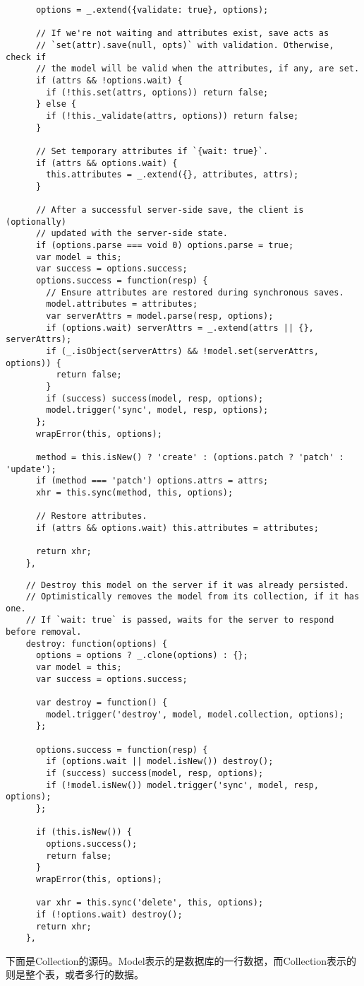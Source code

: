   \begin{lstlisting}
      options = _.extend({validate: true}, options);

      // If we're not waiting and attributes exist, save acts as
      // `set(attr).save(null, opts)` with validation. Otherwise, check if
      // the model will be valid when the attributes, if any, are set.
      if (attrs && !options.wait) {
        if (!this.set(attrs, options)) return false;
      } else {
        if (!this._validate(attrs, options)) return false;
      }

      // Set temporary attributes if `{wait: true}`.
      if (attrs && options.wait) {
        this.attributes = _.extend({}, attributes, attrs);
      }

      // After a successful server-side save, the client is (optionally)
      // updated with the server-side state.
      if (options.parse === void 0) options.parse = true;
      var model = this;
      var success = options.success;
      options.success = function(resp) {
        // Ensure attributes are restored during synchronous saves.
        model.attributes = attributes;
        var serverAttrs = model.parse(resp, options);
        if (options.wait) serverAttrs = _.extend(attrs || {}, serverAttrs);
        if (_.isObject(serverAttrs) && !model.set(serverAttrs, options)) {
          return false;
        }
        if (success) success(model, resp, options);
        model.trigger('sync', model, resp, options);
      };
      wrapError(this, options);

      method = this.isNew() ? 'create' : (options.patch ? 'patch' : 'update');
      if (method === 'patch') options.attrs = attrs;
      xhr = this.sync(method, this, options);

      // Restore attributes.
      if (attrs && options.wait) this.attributes = attributes;

      return xhr;
    },
  \end{lstlisting}

  \begin{lstlisting}
    // Destroy this model on the server if it was already persisted.
    // Optimistically removes the model from its collection, if it has one.
    // If `wait: true` is passed, waits for the server to respond before removal.
    destroy: function(options) {
      options = options ? _.clone(options) : {};
      var model = this;
      var success = options.success;

      var destroy = function() {
        model.trigger('destroy', model, model.collection, options);
      };

      options.success = function(resp) {
        if (options.wait || model.isNew()) destroy();
        if (success) success(model, resp, options);
        if (!model.isNew()) model.trigger('sync', model, resp, options);
      };

      if (this.isNew()) {
        options.success();
        return false;
      }
      wrapError(this, options);

      var xhr = this.sync('delete', this, options);
      if (!options.wait) destroy();
      return xhr;
    },
  \end{lstlisting}

  下面是Collection的源码。Model表示的是数据库的一行数据，而Collection表示的则是整个表，或者多行的数据。
  \begin{lstlisting} 

  \end{lstlisting}
